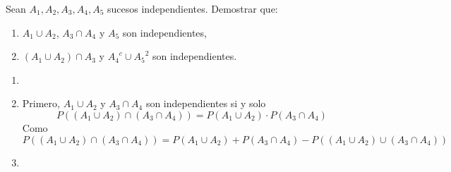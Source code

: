 \begin{ejr}
  Sean $A_{1}, A_{2}, A_{3}, A_{4}, A_{5}$ sucesos independientes. Demostrar que:
  \begin{enumerate}[label=(\roman*)]
    \item $A_{1} \cup A_{2}$, $A_{3} \cap A_{4}$ y $A_{5}$ son independientes,
    \item $(A_{1} \cup A_{2}) \cap A_{3}$ y ${A_{4}}^c \cup {A_{5}}^2$ son independientes.
  \end{enumerate}
\end{ejr}

\begin{sol}
  \begin{enumerate}[label=(\roman*)]
    \item
    \item Primero, $A_{1} \cup A_{2}$ y $A_{3} \cap A_{4}$ son independientes si y solo
      \[ 
        P((A_{1} \cup A_{2}) \cap (A_{3} \cap A_{4})) = P(A_{1} \cup A_{2}) \cdot P(A_{3} \cap A_{4}) 
      \]
      Como
      \[ 
        P((A_{1} \cup A_{2}) \cap (A_{3} \cap A_{4})) = P(A_{1} \cup A_{2}) + P(A_{3} \cap A_{4}) - P((A_{1} \cup A_{2}) \cup (A_{3} \cap A_{4}))
      \] 
    \item 
  \end{enumerate}
\end{sol}
